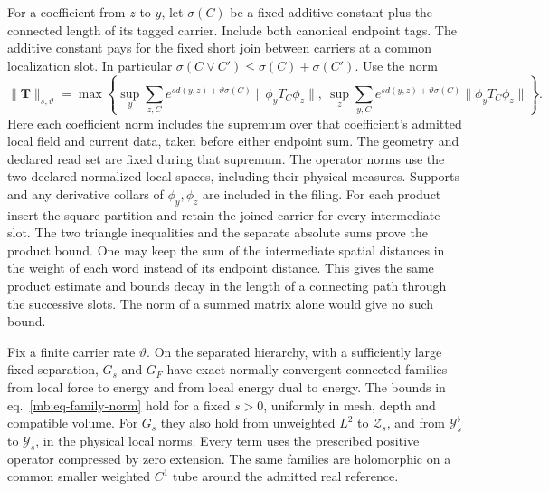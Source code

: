 \documentclass[11pt,letterpaper,reqno]{amsart}
\makeatletter
\numberwithin{equation}{section}
\renewcommand{\eqref}[1]{\textup{eq.~\ref{#1}}}
\theoremstyle{definition}
\newcommand{\ms@minorstart}{%
  \pushQED{\qed}\renewcommand{\qedsymbol}{$\blacksquare$}}
\newenvironment{lemma}[1][]{\ms@minorstart\ms@lemma[#1]}
  {\popQED\endms@lemma}
\theoremstyle{remark}
\makeatother
\begin{document}
For a coefficient from \(z\) to \(y\), let \(\sigma(C)\) be a fixed additive constant plus the connected length of its tagged carrier. Include both canonical endpoint tags. The additive constant pays for the fixed short join between carriers at a common localization slot. In particular \(\sigma(C\vee C')\le \sigma(C)+\sigma(C')\). Use the norm
\begin{equation}\label{mb:eq-family-norm}
 \|\mathbf T\|_{s,\vartheta}
 =\max\left\{
 \sup_y\sum_{z,C}e^{s d(y,z)+\vartheta\sigma(C)}
       \|\phi_y T_C\phi_z\|,
 \ \sup_z\sum_{y,C}e^{s d(y,z)+\vartheta\sigma(C)}
       \|\phi_y T_C\phi_z\|
 \right\}.
\end{equation}
Here each coefficient norm includes the supremum over that coefficient's admitted local field and current data, taken before either endpoint sum. The geometry and declared read set are fixed during that supremum. The operator norms use the two declared normalized local spaces, including their physical measures. Supports and any derivative collars of \(\phi_y,\phi_z\) are included in the filing. For each product insert the square partition and retain the joined carrier for every intermediate slot. The two triangle inequalities and the separate absolute sums prove the product bound. One may keep the sum of the intermediate spatial distances in the weight of each word instead of its endpoint distance. This gives the same product estimate and bounds decay in the length of a connecting path through the successive slots. The norm of a summed matrix alone would give no such bound.

\begin{lemma}[Local positive Green families]
\label{mb:lem-positive-carrier-walks}
Fix a finite carrier rate \(\vartheta\). On the separated hierarchy, with a sufficiently large fixed separation, \(G_s\) and \(G_F\) have exact normally convergent connected families from local force to energy and from local energy dual to energy. The bounds in \eqref{mb:eq-family-norm} hold for a fixed \(s>0\), uniformly in mesh, depth and compatible volume. For \(G_s\) they also hold from unweighted \(L^2\) to \(\mathcal Z_s\), and from \(\mathcal Y_s^\flat\) to \(\mathcal Y_s\), in the physical local norms. Every term uses the prescribed positive operator compressed by zero extension. The same families are holomorphic on a common smaller weighted \(C^1\) tube around the admitted real reference.
\end{lemma}
\end{document}
